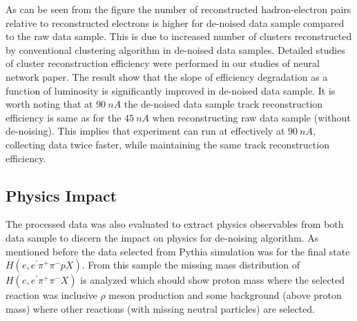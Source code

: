 As can be seen from the figure the number of reconstructed hadron-electron pairs relative to reconstructed electrons is higher for de-noised data sample compared to the raw data sample. This is due to increased number of clusters reconstructed by conventional clustering algorithm in de-noised data samples. Detailed studies of cluster reconstruction efficiency were performed in our studies of neural network paper. The result show that the slope of efficiency degradation as a function of luminosity is significantly improved in de-noised data sample. It is worth noting that at $90~nA$ the de-noised data sample track reconstruction efficiency is same as for the $45~nA$ when reconstructing raw data sample (without de-noising). This implies that experiment can run at effectively at $90~nA$, collecting data twice faster, while maintaining the same track reconstruction efficiency.

\subsection{Physics Impact}

The processed data was also evaluated to extract physics observables from both data sample to discern the impact on physics for de-noising algorithm. As mentioned before the data selected from Pythia simulation was for the final state $H(e,e^\prime\pi^+\pi^-pX)$. From this sample the missing mass distribution of $H(e,e^\prime\pi^+\pi^-X)$ is analyzed which should show proton mass where the selected reaction was inclusive $\rho$ meson production and some background (above proton mass) where other reactions (with missing neutral particles)  are selected.

